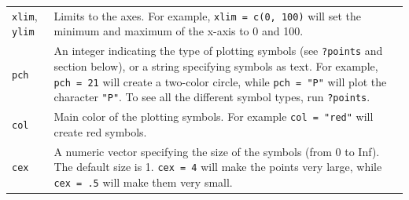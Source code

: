 \documentclass[]{book}
\theoremstyle{definition}
\theoremstyle{definition}
\theoremstyle{remark}
\begin{document}
\begin{longtable}[]{@{}ll@{}}
\begin{minipage}[t]{0.18\columnwidth}
\texttt{xlim}, \texttt{ylim}\strut
\end{minipage} & \begin{minipage}[t]{0.67\columnwidth}\raggedright\strut
Limits to the axes. For example, \texttt{xlim\ =\ c(0,\ 100)} will set
the minimum and maximum of the x-axis to 0 and 100.\strut
\end{minipage}\tabularnewline
\begin{minipage}[t]{0.18\columnwidth}\raggedright\strut
\texttt{pch}\strut
\end{minipage} & \begin{minipage}[t]{0.67\columnwidth}\raggedright\strut
An integer indicating the type of plotting symbols (see \texttt{?points}
and section below), or a string specifying symbols as text. For example,
\texttt{pch\ =\ 21} will create a two-color circle, while
\texttt{pch\ =\ "P"} will plot the character \texttt{"P"}. To see all
the different symbol types, run \texttt{?points}.\strut
\end{minipage}\tabularnewline
\begin{minipage}[t]{0.18\columnwidth}\raggedright\strut
\texttt{col}\strut
\end{minipage} & \begin{minipage}[t]{0.67\columnwidth}\raggedright\strut
Main color of the plotting symbols. For example \texttt{col\ =\ "red"}
will create red symbols.\strut
\end{minipage}\tabularnewline
\begin{minipage}[t]{0.18\columnwidth}\raggedright\strut
\texttt{cex}\strut
\end{minipage} & \begin{minipage}[t]{0.67\columnwidth}\raggedright\strut
A numeric vector specifying the size of the symbols (from 0 to Inf). The
default size is 1. \texttt{cex\ =\ 4} will make the points very large,
while \texttt{cex\ =\ .5} will make them very small.\strut
\end{minipage}\tabularnewline
\bottomrule
\end{longtable}
\end{document}
